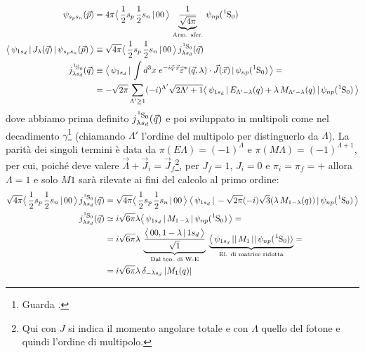 \begin{displaymath}
\begin{aligned}
\psi_{s_p s_n}(\vec{p}) &= 4\pi \clebs{\frac{1}{2}s_p\,\frac{1}{2}s_n}{00}\, \underbrace{\frac{1}{\sqrt{4\pi}}}_\text{Arm. sfer.} \, \psi_{np}(\ce{^1S_0}) \\
%
\oss{\psi_{1s_d}}{J_\lambda(\vec{q})}{\psi_{s_p s_n}(\vec{p})} &\equiv \sqrt{4\pi} \clebs{\frac{1}{2}s_p\,\frac{1}{2}s_n}{00}\, j^{\ce{^1S_0}}_{\lambda s_d} (\vec{q}) \\
j^{\ce{^1S_0}}_{\lambda s_d} (\vec{q}) &\equiv \oss{\psi_{1s_d}}{\int d^3x \; e^{-i\vec{q}\cdot\vec{x}}\widehat{\varepsilon}^*(\vec{q},\lambda) \cdot \vec{J}(\vec{x})}{\psi_{np}(\ce{^1S_0})} = \\
&= -\sqrt{2\pi} \sum_{\Lambda'\geq 1} (-i)^{\Lambda'} \sqrt{2\Lambda' +1} \oss{\psi_{1s_d}}{E_{\Lambda'-\lambda}(q)  + \lambda \, M_{\Lambda'-\lambda}(q)}{\psi_{np}(\ce{^1S_0})}
\end{aligned}
\end{displaymath}
dove abbiamo prima definito $j^{\ce{^1S_0}}_{\lambda s_d} (\vec{q})$ e poi sviluppato in multipoli come nel decadimento $\gamma$\footnote{Guarda .} (chiamando $\Lambda'$ l'ordine del multipolo per distinguerlo da $\Lambda$).
La parità dei singoli termini è data da $\pi(E\Lambda)=(-1)^\Lambda$ e $\pi(M\Lambda)=(-1)^{\Lambda+1}$, per cui, poiché deve valere $\vec{\Lambda}+\vec{J}_i = \vec{J}_f$\footnote{Qui con $J$ si indica il momento angolare totale e con $\Lambda$ quello del fotone e quindi l'ordine di multipolo.}, per $J_f = 1$, $J_i = 0$ e $\pi_i=\pi_f=+$ allora $\Lambda = 1$ e solo $M1$ sarà rilevate ai fini del calcolo al primo ordine:
\begin{displaymath}
\begin{aligned}
\sqrt{4\pi} \clebs{\frac{1}{2}s_p\,\frac{1}{2}s_n}{00}\, j^{\ce{^1S_0}}_{\lambda s_d} (\vec{q}) &= \sqrt{4\pi} \clebs{\frac{1}{2}s_p\,\frac{1}{2}s_n}{00}\: \oss{\psi_{1s_d}}{-\sqrt{2\pi}(-i) \sqrt{3} (\lambda\,M_{1-\lambda}(q))}{\psi_{np}(\ce{^1S_0})}\\
j^{\ce{^1S_0}}_{\lambda s_d} (\vec{q})&\simeq i\sqrt{6\pi} \lambda \oss{\psi_{1s_d}}{M_{1\,-\lambda}}{\psi_{np}(\ce{^1S_0})} =\\
&= i \sqrt{6\pi} \lambda \:\underbrace{ \frac{\clebs{00,1-\lambda}{1s_d}}{\sqrt{1}}}_\text{Dal teo. di W-E} \: \underbrace{\bigl \langle \, \psi_{1s_d}\,||\,M_1\,||\,\psi_{np}(\ce{^1S_0})\rangle}_\text{El. di matrice ridotta} = \\
&= i \sqrt{6\pi} \lambda \: \delta_{-\lambda s_d} \: |M_1(q)|
\end{aligned}
\end{displaymath}

